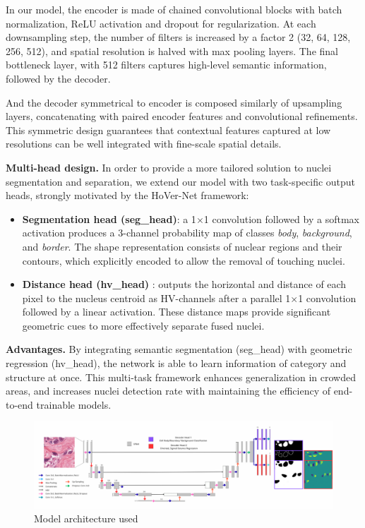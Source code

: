\documentclass[target=bach,aauheader=,style=]{thud}
\begin{document}
In our model, the encoder is made of chained convolutional blocks with batch normalization, ReLU activation and dropout for regularization.
At each downsampling step, the number of filters is increased by a factor 2 (32, 64, 128, 256, 512), and spatial resolution is halved with max pooling layers.
The final bottleneck layer, with 512 filters captures high-level semantic information, followed by the decoder.

And the decoder symmetrical to encoder is composed similarly of upsampling layers, concatenating with paired encoder features and convolutional refinements.
This symmetric design guarantees that contextual features captured at low resolutions can be well integrated with fine-scale spatial details.

\noindent\textbf{Multi-head design.}
In order to provide a more tailored solution to nuclei segmentation and separation, we extend our model with two task-specific output heads, strongly motivated by the HoVer-Net \cite{graham2019hovernet} framework:
\begin{itemize}
\item \textbf{Segmentation head (seg\_head)}: a 1$\times$1 convolution followed by a softmax activation produces a 3-channel probability map of classes \textit{body}, \textit{background}, and \textit{border}. The shape representation consists of nuclear regions and their contours, which explicitly encoded to allow the removal of touching nuclei.
\item \textbf{Distance head (hv\_head)} : outputs the horizontal and distance of each pixel to the nucleus centroid as HV-channels after a parallel 1$\times$1 convolution followed by a linear activation. These distance maps provide significant geometric cues to more effectively separate fused nuclei.
\end{itemize}

\noindent\textbf{Advantages.}
By integrating semantic segmentation (seg\_head) with geometric regression (hv\_head), the network is able to learn information of category and structure at once.
This multi-task framework enhances generalization in crowded areas, and increases nuclei detection rate with maintaining the efficiency of end-to-end trainable models.
\begin{figure}[H] %
    \centering
    \includegraphics[width=1\textwidth]{imgs/model.png}
    \caption{Model architecture used}
    \label{fig:Unet}
\end{figure}
\end{document}
